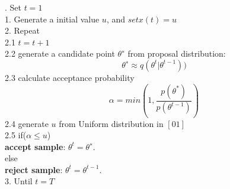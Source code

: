 {. \hspace*{0.2cm} Set $t=1$  \\
1. \hspace*{0.2cm} Generate a initial value $u$, and $set x(t) = u$\\
2. \hspace*{0.2cm}  Repeat\\
2.1 \hspace*{0.3cm} $t=t+1$\\
2.2 \hspace*{0.3cm} generate a candidate point $\theta^∗$ from proposal distribution:
$$
\theta^∗ \approx q(\theta^t|\theta^{t-1}))
$$
2.3 \hspace*{0.3cm} calculate acceptance probability \\
$$
\alpha = min(1, \frac{p(\theta^*)}{p(\theta^{t-1})})
$$
2.4 \hspace*{0.3cm} generate $u$ from Uniform distribution in $[0 1]$\\
2.5 \hspace*{0.3cm} if($\alpha  \leq u$)\\
\hspace*{0.4cm}  \textbf{accept sample}: $\theta^t=\theta^∗$.\\
\hspace*{0.3cm} else\\
\hspace*{0.4cm}  \textbf{reject sample}: $\theta^t=\theta^{t-1}$.\\
3. \hspace*{0.2cm} Until $t = T$\\
}\\[.4cm]
\\
\\

